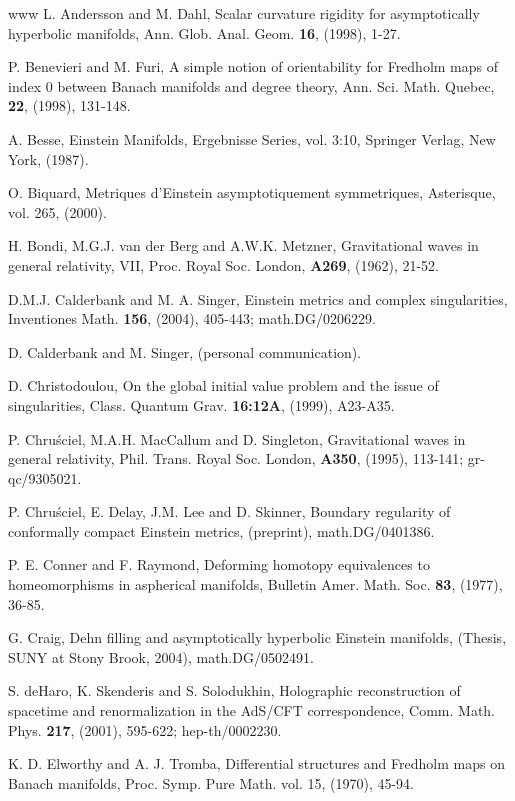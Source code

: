 \documentclass[11pt,amsfonts]{amsart}
\begin{document}
\begin{thebibliography}{www}
 L. Andersson and M. Dahl, Scalar curvature rigidity for 
asymptotically hyperbolic manifolds, Ann. Glob. Anal. Geom. {\bf 16}, (1998), 
1-27. 

 P. Benevieri and M. Furi, A simple notion 
of orientability for Fredholm maps of index 0 between Banach manifolds 
and degree theory, Ann. Sci. Math. Quebec, {\bf 22}, (1998), 131-148. 

 A. Besse, Einstein Manifolds, Ergebnisse Series, vol. 3:10, 
Springer Verlag, New York, (1987). 

 O. Biquard, Metriques d'Einstein 
asymptotiquement symmetriques, Asterisque, vol. 265, (2000).

 H. Bondi, M.G.J. van der Berg and A.W.K. Metzner, Gravitational 
waves in general relativity, VII, Proc. Royal Soc. London, {\bf A269}, (1962), 
21-52. 

 D.M.J. Calderbank and M. A. Singer, Einstein metrics and complex 
singularities, Inventiones Math. {\bf 156}, (2004), 405-443; math.DG/0206229.  

 D. Calderbank and M. Singer, (personal communication). 

 D. Christodoulou, On the global initial value problem and the 
issue of singularities, Class. Quantum Grav. {\bf 16:12A}, (1999), A23-A35.

 P. Chru\'sciel, M.A.H. MacCallum and D. Singleton, 
Gravitational waves in general relativity, Phil. Trans. Royal Soc. London, 
{\bf A350}, (1995), 113-141; gr-qc/9305021. 

 P. Chru\'sciel, E. Delay, J.M. Lee and D. Skinner, Boundary 
regularity of conformally compact Einstein metrics, (preprint), math.DG/0401386.

 P. E. Conner and F. Raymond, Deforming homotopy equivalences to 
homeomorphisms in aspherical manifolds, Bulletin Amer. Math. Soc. {\bf 83}, (1977), 
36-85. 

 G. Craig, Dehn filling and asymptotically hyperbolic Einstein 
manifolds, (Thesis, SUNY at Stony Brook, 2004), math.DG/0502491.

 S. deHaro, K. Skenderis and S. Solodukhin, Holographic 
reconstruction of spacetime and renormalization in the AdS/CFT correspondence, 
Comm. Math. Phys. {\bf 217}, (2001), 595-622; hep-th/0002230. 

 K. D. Elworthy and A. J. Tromba, Differential structures and Fredholm maps 
on Banach manifolds, Proc. Symp. Pure Math. vol. 15, (1970), 45-94. 


\end{thebibliography}
\end{document}
